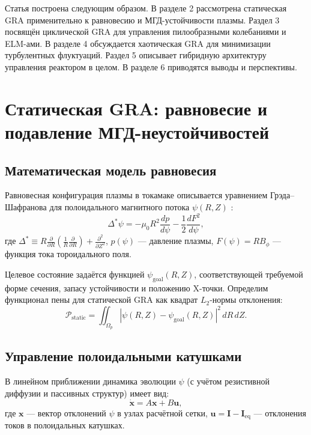 \documentclass[12pt,a4paper]{article}
\numberwithin{equation}{section}
\begin{document}
Статья построена следующим образом. В разделе 2 рассмотрена статическая GRA применительно к равновесию и МГД-устойчивости плазмы. Раздел 3 посвящён циклической GRA для управления пилообразными колебаниями и ELM-ами. В разделе 4 обсуждается хаотическая GRA для минимизации турбулентных флуктуаций. Раздел 5 описывает гибридную архитектуру управления реактором в целом. В разделе 6 приводятся выводы и перспективы.

\section{Статическая GRA: равновесие и подавление МГД-неустойчивостей}
\label{sec:static}

\subsection{Математическая модель равновесия}
Равновесная конфигурация плазмы в токамаке описывается уравнением Грэда--Шафранова для полоидального магнитного потока $\psi(R,Z)$ \cite{wesson_tokamaks}:
\begin{equation}
\Delta^* \psi = -\mu_0 R^2 \frac{dp}{d\psi} - \frac{1}{2}\frac{dF^2}{d\psi},
\label{eq:GS}
\end{equation}
где $\Delta^* \equiv R\frac{\partial}{\partial R}\left(\frac{1}{R}\frac{\partial}{\partial R}\right) + \frac{\partial^2}{\partial Z^2}$, $p(\psi)$ --- давление плазмы, $F(\psi)=R B_\phi$ --- функция тока тороидального поля.

Целевое состояние задаётся функцией $\psi_{\text{goal}}(R,Z)$, соответствующей требуемой форме сечения, запасу устойчивости и положению X-точки. Определим функционал пены для статической GRA как квадрат $L_2$-нормы отклонения:
\begin{equation}
\mathcal{P}_{\text{static}} = \iint_{\Omega_p} |\psi(R,Z) - \psi_{\text{goal}}(R,Z)|^2 \, dR\, dZ.
\label{eq:Pstatic}
\end{equation}

\subsection{Управление полоидальными катушками}
В линейном приближении динамика эволюции $\psi$ (с учётом резистивной диффузии и пассивных структур) имеет вид:
\begin{equation}
\dot{\mathbf{x}} = A \mathbf{x} + B \mathbf{u},
\label{eq:linear}
\end{equation}
где $\mathbf{x}$ --- вектор отклонений $\psi$ в узлах расчётной сетки, $\mathbf{u} = \mathbf{I} - \mathbf{I}_{\text{eq}}$ --- отклонения токов в полоидальных катушках.
\end{document}
